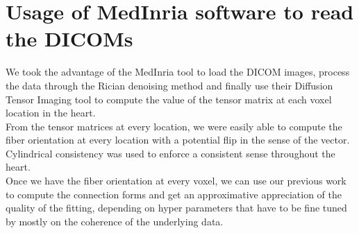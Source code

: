 \section{Usage of MedInria software to read the DICOMs}

We took the advantage of the MedInria tool to load the DICOM images, process the data through the Rician denoising method and finally use their Diffusion Tensor Imaging tool to compute the value of the tensor matrix at each voxel location in the heart. \\
From the tensor matrices at every location, we were easily able to compute the fiber orientation at every location with a potential flip in the sense of the vector. Cylindrical consistency was used to enforce a consistent sense throughout the heart. \\
Once we have the fiber orientation at every voxel, we can use our previous work to compute the connection forms and get an approximative appreciation of the quality of the fitting, depending on hyper parameters that have to be fine tuned by mostly on the coherence of the underlying data.